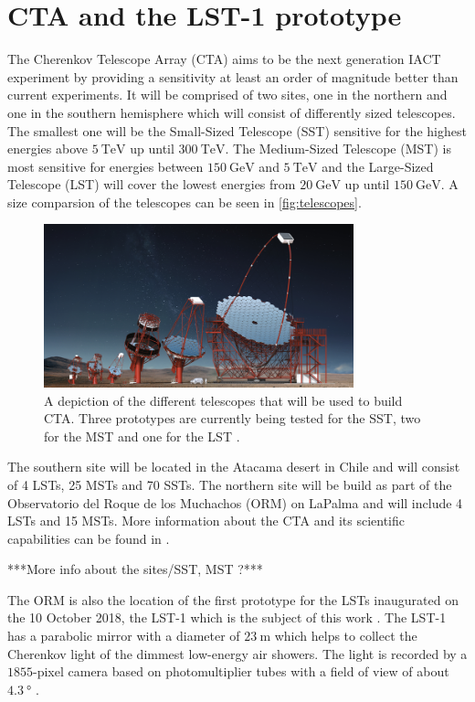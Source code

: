 \section{CTA and the LST-1 prototype}
The Cherenkov Telescope Array (CTA) aims to be the next generation IACT experiment by providing a sensitivity at least an order of magnitude better than current experiments.
It will be comprised of two sites, one in the northern and one in the southern hemisphere which will consist of differently sized telescopes. 
The smallest one will be the Small-Sized Telescope (SST) sensitive for the highest energies above $\SI{5}{\tera\electronvolt}$ up until $\SI{300}{\tera\electronvolt}$.
The Medium-Sized Telescope (MST) is most sensitive for energies between $\SI{150}{\giga\electronvolt}$ and $\SI{5}{\tera\electronvolt}$ and the 
Large-Sized Telescope (LST) will cover the lowest energies from $\SI{20}{\giga\electronvolt}$ up until $\SI{150}{\giga\electronvolt}$.
A size comparsion of the telescopes can be seen in \autoref{fig:telescopes}.
\begin{figure}
    \centering
    \includegraphics[width=0.8\textwidth]{images/CTA_telescopes.png}
    \caption{A depiction of the different telescopes that will be used to build CTA. 
        Three prototypes are currently being tested for the SST, two for the MST and one for the LST \cite{cta-website}.
    }
    \label{fig:telescopes}
\end{figure}

The southern site will be located in the Atacama desert in Chile and will consist of \num{4} LSTs, \num{25} MSTs and \num{70} SSTs.
The northern site will be build as part of the Observatorio del Roque de los Muchachos (ORM) on LaPalma and will include \num{4} LSTs and \num{15} MSTs.
More information about the CTA and its scientific capabilities can be found in \cite{science_with_cta}.

***More info about the sites/SST, MST ?***

The ORM is also the location of the first prototype for the LSTs inaugurated on the 10 October 2018, the LST-1 which is the subject of this work \cite{lst_inauguration}.
The LST-1 has a parabolic mirror with a diameter of $\SI{23}{\meter}$ which helps to collect the Cherenkov light of the dimmest low-energy air showers.
The light is recorded by a $\num{1855}$-pixel camera based on photomultiplier tubes with a field of view of about $\SI{4.3}{\degree}$ \cite{cta-website}.

